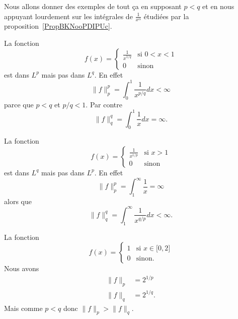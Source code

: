 Nous allons donner des exemples de tout ça en supposant \( p<q\) et en nous appuyant lourdement sur les intégrales de \( \frac{1}{ x^{\alpha} }\) étudiées par la proposition~\ref{PropBKNooPDIPUc}.

\begin{subproof}
	\spitem[\( L^p\nsubseteq L^q\)]

	La fonction
	\begin{equation}    \label{EqXIEooZpxObV}
		f(x)=\begin{cases}
			\frac{1}{ x^{1/q} } & \text{si } 0<x<1 \\
			0                   & \text{sinon}
		\end{cases}
	\end{equation}
	est dans \( L^p\) mais pas dans \( L^q\). En effet
	\begin{equation}
		\| f \|_p^p=\int_0^1\frac{1}{ x^{p/q} }dx<\infty
	\end{equation}
	parce que \( p<q\) et \( p/q<1\). Par contre
	\begin{equation}
		\| f \|_q^q=\int_0^1\frac{1}{ x }dx=\infty.
	\end{equation}

	\spitem[\( L^q\nsubseteq L^p\)]

	La fonction
	\begin{equation}
		f(x)=\begin{cases}
			\frac{1}{ x^{1/p} } & \text{si } x>1 \\
			0                   & \text{sinon}
		\end{cases}
	\end{equation}
	est dans \( L^q\) mais pas dans \( L^p\). En effet
	\begin{equation}
		\| f \|_p^p=\int_1^{\infty}\frac{1}{ x }=\infty
	\end{equation}
	alors que
	\begin{equation}
		\| f \|_q^q=\int_1^{\infty}\frac{1}{ x^{q/p} }dx<\infty.
	\end{equation}

	\spitem[Exemple de \( \| f \|_p>\| f \|_q\)]

	La fonction
	\begin{equation}
		f(x)=\begin{cases}
			1 & \text{si } x\in\mathopen[ 0 , 2 \mathclose] \\
			0 & \text{sinon.}
		\end{cases}
	\end{equation}
	Nous avons
	\begin{subequations}
		\begin{align}
			\| f \|_p & =2^{1/p}  \\
			\| f \|_q & =2^{1/q}.
		\end{align}
	\end{subequations}
	Mais comme \( p<q\) donc \( \| f \|_p>\| f \|_q\).



\end{subproof}
